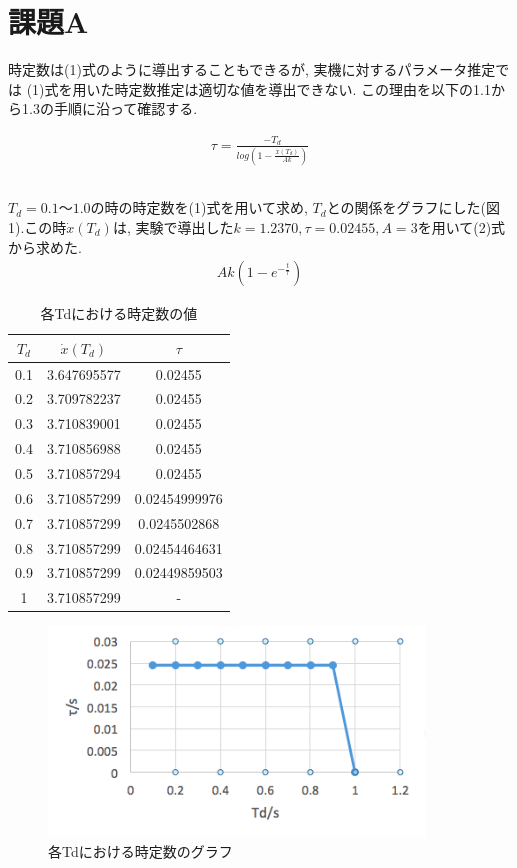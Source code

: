 \documentclass[a4paper,11pt]{jsarticle}
\begin{document}
\section{課題A}時定数は(1)式のように導出することもできるが, 実機に対するパラメータ推定では
(1)式を用いた時定数推定は適切な値を導出できない. この理由を以下の1.1から1.3の手順に沿って確認する.

\begin{align}
		\tau=\frac{-T_d}{log(1-\frac{\dot{x}(T_d)}{Ak})}
\end{align}

\subsection{}
$T_d = 0.1〜1.0$の時の時定数を(1)式を用いて求め, $T_d$との関係をグラフにした(図1).この時$\dot{x}(T_d)$は,
実験で導出した$k=1.2370,\tau=0.02455,A=3$を用いて(2)式から求めた.
\begin{align}
		Ak(1-e^{-\frac{t}{\tau}})
\end{align}
\begin{table}[H]
	\caption{各Tdにおける時定数の値}
	\label{No.1}
	\begin{center}
		\begin{tabular}{|c|c|c|}\hline
			$T_d$ & $\dot{x}(T_d)$	& $\tau$ \\ \hline
			0.1	& 3.647695577	& 0.02455 \\ \hline
			0.2	& 3.709782237	& 0.02455 \\ \hline
			0.3	& 3.710839001	& 0.02455 \\ \hline
			0.4	& 3.710856988	& 0.02455 \\ \hline
			0.5	& 3.710857294	& 0.02455 \\ \hline
			0.6	& 3.710857299	& 0.02454999976 \\ \hline
			0.7	& 3.710857299	& 0.0245502868 \\ \hline
			0.8	& 3.710857299	& 0.02454464631 \\ \hline
			0.9	& 3.710857299	& 0.02449859503 \\ \hline
			1	& 3.710857299	& - \\ \hline
		\end{tabular}
\end{center}
\end{table}

\begin{figure}[H]
	\begin{center}
		\includegraphics[width=10cm]{各Tdにおける時定数のグラフ.png}
		\caption{各Tdにおける時定数のグラフ}
		\label{各Tdにおける時定数のグラフ}
	\end{center}
\end{figure}
\end{document}
